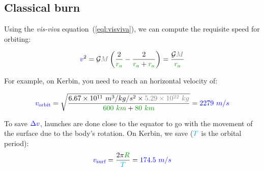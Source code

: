 \subsection{Classical burn}

Using the \emph{vis-viva} equation~(\ref{eql:visviva}), we can compute
the requisite speed for orbiting:

\[
\speed{v}^2
=
\mathcal G \mass{M} \left(\frac 2 {\dist{r_a}} - \frac 2 {\dist{r_a}+\dist{r_a}}\right)
=
\frac {\mathcal G \mass{M}} {\dist{r_a}}
\]

For example, on Kerbin, you need to reach an horizontal velocity of:

\[
\speed{v_{\text{orbit}}}
=
\sqrt{\frac {6.67 \times 10^{11}~m^3/kg/s^2 \times \mass{5.29 \times 10^{22}~kg}} {\dist{600~km} + \dist{80~km}}}
=
\speed{2279~m/s}
\]

\begin{remark}
To save $\textcolor{blue}{\Delta v}$, launches are done close to the equator to go
with the movement of the surface due to the body's rotation. On Kerbin,
we save ($\textcolor{cyan}{T}$ is the orbital period): \[
\speed{v_{\text{surf}}}
=
\frac {2\pi \dist{R}} {\delay{T}}
=
\speed{174.5~m/s}
\]
\end{remark}

